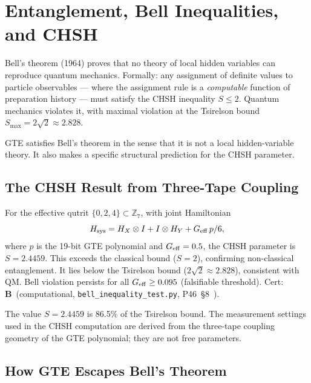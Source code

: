 \documentclass[11pt,openany]{book}
\theoremstyle{remark}
\newcommand{\CatB}{\textbf{B}}
\begin{document}
\section{Entanglement, Bell Inequalities, and CHSH}
\label{sec:bell}

Bell's theorem (1964) proves that no theory of local hidden variables can reproduce
quantum mechanics.  Formally: any assignment of definite values to particle observables
--- where the assignment rule is a \emph{computable} function of preparation history
--- must satisfy the CHSH inequality $S \leq 2$.  Quantum mechanics violates it, with
maximal violation at the Tsirelson bound $S_{\max} = 2\sqrt{2} \approx 2.828$.

GTE satisfies Bell's theorem in the sense that it is not a local hidden-variable theory.
It also makes a specific structural prediction for the CHSH parameter.

\subsection*{The CHSH Result from Three-Tape Coupling}

\begin{tcolorbox}[colback=orange!5,colframe=orange!60,
  title={Result: CHSH $S = 2.4459$ from Three-Tape Polynomial (\CatB)}]
  For the effective qutrit $\{0,2,4\} \subset \mathbb{Z}_7$, with joint Hamiltonian
  \[
    H_{\rm sys} = H_X \otimes I + I \otimes H_Y + G_{\rm eff}\,p/6,
  \]
  where $p$ is the 19-bit GTE polynomial and $G_{\rm eff} = 0.5$,
  the CHSH parameter is $S = 2.4459$.
  This exceeds the classical bound ($S = 2$), confirming non-classical entanglement.
  It lies below the Tsirelson bound ($2\sqrt{2} \approx 2.828$), consistent with QM.
  Bell violation persists for all $G_{\rm eff} \geq 0.095$ (falsifiable threshold).
  Cert: \CatB\ (computational, \texttt{bell\_inequality\_test.py},
  P46~§8~\cite{SpivackGTEPolynomialUFT}).
\end{tcolorbox}

The value $S = 2.4459$ is 86.5\% of the Tsirelson bound.  The measurement settings used
in the CHSH computation are derived from the three-tape coupling geometry of the GTE
polynomial; they are not free parameters.

\subsection*{How GTE Escapes Bell's Theorem}
\end{document}
